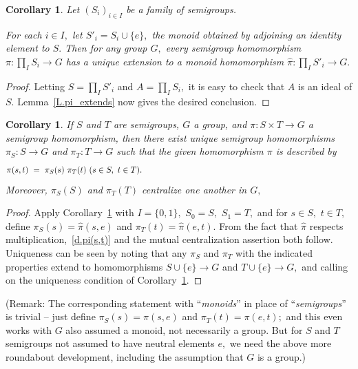 \documentclass{amsart}
\newtheorem{corollary}[theorem]{Corollary}
\numberwithin{equation}{section}
\numberwithin{theorem}{section}
\begin{document}
\begin{corollary}\label{C.pi_on_prod}
Let $(S_i)_{i\in I}$ be a family of semigroups.

For each $i\in I,$ let $S'_i = S_i \cup \{e\},$ the monoid obtained
by adjoining an identity element to $S.$
Then for any group $G,$ every
semigroup homomorphism $\pi: \prod_I S_i\to G$ has a unique
extension to a monoid homomorphism $\hat{\pi}: \prod_I S'_i\to G.$
\end{corollary}

\begin{proof}
Letting $S = \prod_I S'_i$ and $A=\prod_I S_i,$
it is easy to check that $A$ is an ideal of $S.$
Lemma~\ref{L.pi_extends} now gives the desired conclusion.
\end{proof}

\begin{corollary}\label{C.pi_SxT}
If $S$ and $T$ are semigroups, $G$ a group,
and $\pi: S\times T\to G$ a semigroup homomorphism, then there exist
unique semigroup homomorphisms $\pi_S: S\to G$ and $\pi_T: T\to G$
such that the given homomorphism $\pi$ is described by
%
\begin{equation}\begin{minipage}[c]{35pc}\label{d.pi(s,t)}
$\pi(s,t)~=~\pi_S(s)~\pi_T(t)$ $(s\in S,\,\,t\in T).$
\end{minipage}\end{equation}
%
Moreover, $\pi_S(S)$ and $\pi_T(T)$ centralize one another in $G,$
\end{corollary}

\begin{proof}
Apply Corollary~\ref{C.pi_on_prod} with
$I=\{0,1\},$ $S_0 = S,$ $S_1 = T,$
and for $s\in S,$ $t\in T,$ define $\pi_S(s) = \hat{\pi}(s,e)$ and
$\pi_T(t) = \hat{\pi}(e,t).$
From the fact that $\hat{\pi}$ respects
multiplication,~\eqref{d.pi(s,t)} and the mutual centralization
assertion both follow.
Uniqueness can be seen by noting that any $\pi_S$ and $\pi_T$
with the indicated properties extend to
homomorphisms $S\cup\{e\}\to G$ and $T\cup\{e\}\to G,$ and calling on
the uniqueness condition of Corollary~\ref{C.pi_on_prod}.
\end{proof}

(Remark: The corresponding statement with ``{\em monoids}'' in place of
``{\em semigroups}'' is trivial -- just define $\pi_S(s)=\pi(s,e)$
and $\pi_T(t)=\pi(e,t);$ and this even works with $G$ also
assumed a monoid, not necessarily a group.
But for $S$ and $T$ semigroups not assumed to have
neutral elements $e,$ we need the above more
roundabout development, including the assumption that $G$ is a group.)
\end{document}
